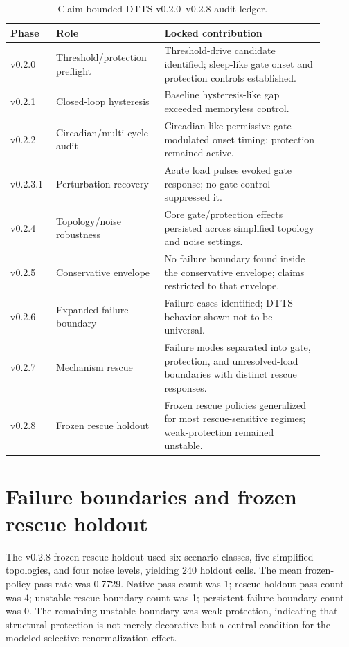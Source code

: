 \documentclass[11pt,a4paper]{article}
\begin{document}
\begin{table}[H]
\centering
\small
\begin{tabular}{p{0.13\linewidth}p{0.30\linewidth}p{0.47\linewidth}}
\toprule
Phase & Role & Locked contribution \\
\midrule
v0.2.0 & Threshold/protection preflight & Threshold-drive candidate identified; sleep-like gate onset and protection controls established. \\
v0.2.1 & Closed-loop hysteresis & Baseline hysteresis-like gap exceeded memoryless control. \\
v0.2.2 & Circadian/multi-cycle audit & Circadian-like permissive gate modulated onset timing; protection remained active. \\
v0.2.3.1 & Perturbation recovery & Acute load pulses evoked gate response; no-gate control suppressed it. \\
v0.2.4 & Topology/noise robustness & Core gate/protection effects persisted across simplified topology and noise settings. \\
v0.2.5 & Conservative envelope & No failure boundary found inside the conservative envelope; claims restricted to that envelope. \\
v0.2.6 & Expanded failure boundary & Failure cases identified; DTTS behavior shown not to be universal. \\
v0.2.7 & Mechanism rescue & Failure modes separated into gate, protection, and unresolved-load boundaries with distinct rescue responses. \\
v0.2.8 & Frozen rescue holdout & Frozen rescue policies generalized for most rescue-sensitive regimes; weak-protection remained unstable. \\
\bottomrule
\end{tabular}
\caption{Claim-bounded DTTS v0.2.0--v0.2.8 audit ledger.}
\label{tab:ledger}
\end{table}

\section{Failure boundaries and frozen rescue holdout}
The v0.2.8 frozen-rescue holdout used six scenario classes, five simplified topologies, and four noise levels, yielding 240 holdout cells. The mean frozen-policy pass rate was 0.7729. Native pass count was 1; rescue holdout pass count was 4; unstable rescue boundary count was 1; persistent failure boundary count was 0. The remaining unstable boundary was weak protection, indicating that structural protection is not merely decorative but a central condition for the modeled selective-renormalization effect.
\end{document}
